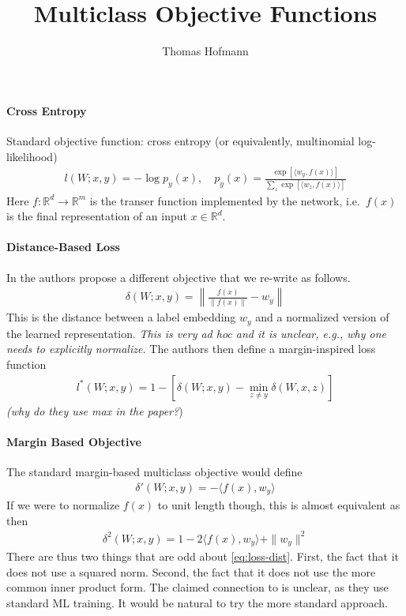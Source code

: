 \documentclass{article}
\author{Thomas Hofmann}
\title{Multiclass Objective Functions}
\renewcommand{\Re}{{\mathbb R}}
\begin{document}
\maketitle

\paragraph{Cross Entropy} 

Standard objective function: cross entropy (or equivalently, multinomial log-likelihood) 
\begin{align}
l(W;x,y) = -\log p_y(x), \quad p_y(x) = \frac{ \exp\left[ \langle w_y, f(x) \rangle \right] }{ \sum_z \exp \left[ \langle w_z, f(x) \rangle\right]}
\end{align}
Here $f: \Re^d \to \Re^m$ is the transer function implemented by the network, i.e.~$f(x)$ is the final representation of an input $x \in \Re^d$. 

\paragraph{Distance-Based Loss} 

In \cite{wang2016relation} the authors propose a different objective that we re-write as follows. 
\begin{align}
\label{eq:loss-dist}
\delta(W;x,y) = \left\| \frac{f(x)}{\| f(x)\|} - w_y   \right\| 
\end{align}
This is the distance between a label embedding $w_y$ and a normalized version of the learned representation. \textit{This is very ad hoc and it is unclear, e.g., why one needs to explicitly normalize.} 
%
The authors then define a margin-inspired loss function 
\begin{align}
l^*(W; x,y) = 1 - \left[ \delta(W; x,y) - \min_{z \neq y} \delta(W, x,z)\right]
\end{align}
\textit{(why do they use max in the paper?})

\paragraph{Margin Based Objective}

The standard margin-based multiclass objective would define 
\begin{align}
\delta'(W; x,y) = -\langle f(x), w_y \rangle
\end{align}
If we were to normalize $f(x)$ to unit length though, this is almost equivalent as then
\begin{align}
\delta^2(W; x,y) = 1 - 2 \langle f(x), w_y \rangle + \| w_y\|^2
\end{align}
There are thus two things that are odd about \eqref{eq:loss-dist}. First, the fact that it does not use a squared norm. Second, the fact that it does not use the more common inner product form. The claimed connection to \cite{mikolov2013linguistic} is unclear, as they use standard ML training. It would be natural to try the more standard approach.  
\end{document}

